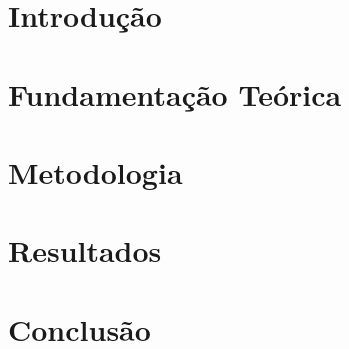 \documentclass[12pt]{article}
\begin{document}
\section{Introdução}
\label{sec:introducao}


\section{Fundamentação Teórica}
\label{sec:fundamentos}


\section{Metodologia}
\label{sec:metodologia}


\section{Resultados}
\label{sec:resultados}


\section{Conclusão}
\label{sec:conclusao}




\end{document}
